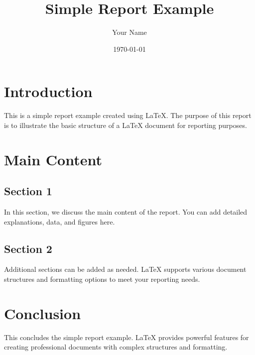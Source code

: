\documentclass[a4paper,12pt]{article}
\begin{document}
\title{Simple Report Example}
\author{Your Name}
\date{\today}
\maketitle

\section{Introduction}

This is a simple report example created using LaTeX. The purpose of this report is to illustrate the basic structure of a LaTeX document for reporting purposes.

\section{Main Content}

\subsection{Section 1}

In this section, we discuss the main content of the report. You can add detailed explanations, data, and figures here.

\subsection{Section 2}

Additional sections can be added as needed. LaTeX supports various document structures and formatting options to meet your reporting needs.

\section{Conclusion}

This concludes the simple report example. LaTeX provides powerful features for creating professional documents with complex structures and formatting.
\end{document}

